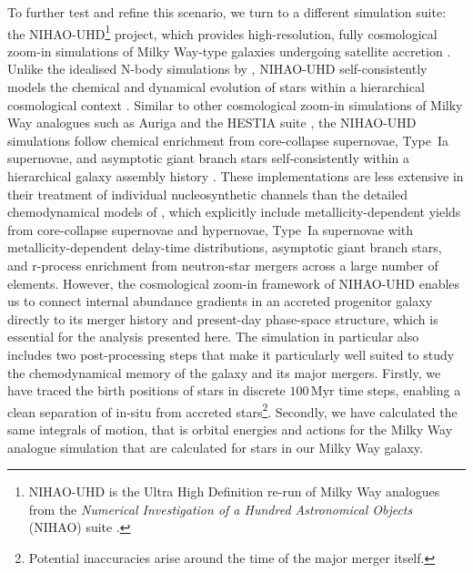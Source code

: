 \documentclass[fleqn,usenatbib]{mnras}
\newcommand{\changed}[1]{{{#1}}}
\begin{document}
To further test and refine this scenario, we turn to a different simulation suite: the NIHAO-UHD\thanks{NIHAO-UHD is the Ultra High Definition re-run of Milky Way analogues from the \textit{Numerical Investigation of a Hundred Astronomical Objects} (NIHAO) suite \citep{Wang2015}.} project, which provides high-resolution, fully cosmological zoom-in simulations of Milky Way-type galaxies undergoing satellite accretion \citep{Buck2020, Buck2020b, Buck2021}. Unlike the idealised N-body simulations by \citet{Mori2024}, NIHAO-UHD self-consistently models the chemical and dynamical evolution of stars within a hierarchical cosmological context \citep{Buck2021}. \changed{Similar to other cosmological zoom-in simulations of Milky Way analogues such as Auriga \citep{Grand2017} and the HESTIA suite \citep{Khoperskov2023}, the NIHAO-UHD simulations follow chemical enrichment from core-collapse supernovae, Type~Ia supernovae, and asymptotic giant branch stars self-consistently within a hierarchical galaxy assembly history \citep{Buck2021}. These implementations are less extensive in their treatment of individual nucleosynthetic channels than the detailed chemodynamical models of \citet{Kobayashi2011,Kobayashi2020}, which explicitly include metallicity-dependent yields from core-collapse supernovae and hypernovae, Type~Ia supernovae with metallicity-dependent delay-time distributions, asymptotic giant branch stars, and r-process enrichment from neutron-star mergers across a large number of elements. However, the cosmological zoom-in framework of NIHAO-UHD enables us to connect internal abundance gradients in an accreted progenitor galaxy directly to its merger history and present-day phase-space structure, which is essential for the analysis presented here.
} The simulation in particular also includes two post-processing steps that make it particularly well suited to study the chemodynamical memory of the galaxy and its major mergers. Firstly, we have traced the birth positions of stars in discrete $100\,\mathrm{Myr}$ time steps, enabling a clean separation of in-situ from accreted stars\footnote{Potential inaccuracies arise around the time of the major merger itself.}. Secondly, we have calculated the same integrals of motion, that is orbit\changed{al} energies and actions for the Milky Way analogue simulation that are calculated for stars in our Milky Way galaxy.
\end{document}
